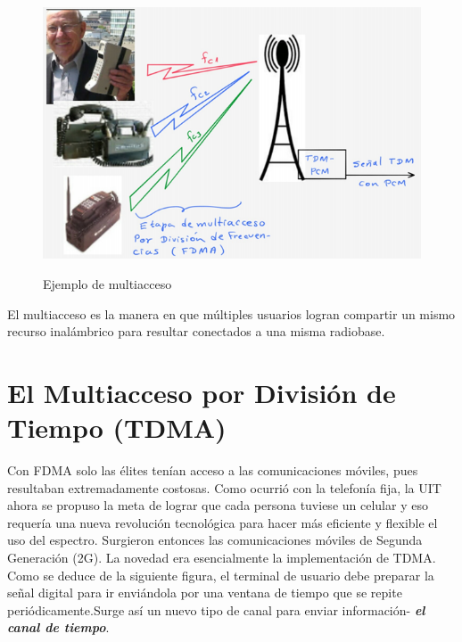 \begin{figure}[h!]
	\captionsetup{justification = raggedright, singlelinecheck = false}
	\caption{Ejemplo de multiacceso} 
	\centering
	\includegraphics[scale=0.5]{Imagenes/Multiacceso.png}
	\label{fig:Multiacceso}
\end{figure}

El multiacceso es la manera en que múltiples usuarios logran compartir un mismo recurso inalámbrico para resultar conectados a una misma radiobase. \\

\section{El Multiacceso por División de Tiempo (TDMA)}

Con FDMA solo las élites tenían acceso a las comunicaciones móviles, pues resultaban extremadamente costosas. Como ocurrió con la telefonía fija, la UIT ahora se propuso la meta de lograr que cada persona tuviese un  celular y eso requería una nueva revolución tecnológica para hacer más eficiente y flexible el uso del espectro. Surgieron entonces las comunicaciones móviles de Segunda Generación (2G). La novedad era esencialmente la implementación de TDMA. Como se deduce de la siguiente figura, el terminal de usuario debe preparar la señal digital para ir enviándola por una ventana de tiempo que se repite periódicamente.Surge así un nuevo tipo de canal para enviar información- \textbf{\textit{el canal de tiempo}}.\\

